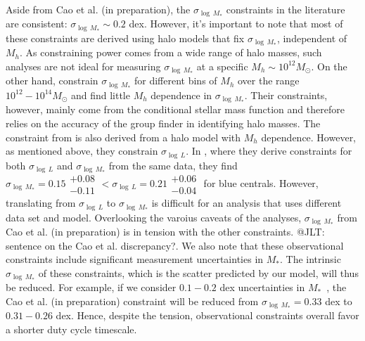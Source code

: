 \documentclass[12pt, letterpaper, preprint, tighten]{aastex62}
\newcommand{\ch}[1]{\color{orange}{\bf CH:} #1}
\begin{document}
Aside from Cao et al. (in preparation), the $\sigma_{\log\,M_*}$ constraints 
in the literature are consistent: $\sigma_{\log\,M_*} \sim 0.2$ dex. However, 
it's important to note that most of these constraints are derived using halo
models that fix $\sigma_{\log\,M_*}$, independent of $M_h$. As constraining 
power comes from a wide range of halo masses, such analyses are not ideal 
for measuring $\sigma_{\log\,M_*}$ at a specific $M_h\sim 10^{12}M_\odot$. 
On the other hand, \cite{reddick2013} constrain $\sigma_{\log\,M_*}$ for 
different bins of $M_h$ over the range $10^{12} - 10^{14} M_\odot$ and find 
little $M_h$ dependence in $\sigma_{\log\,M_*}$. Their constraints, however,
mainly come from the conditional stellar mass function and therefore relies on 
the accuracy of the \cite{tinker2011} group finder in identifying halo masses. 
The constraint from \cite{lange2018a} is also derived from a halo model 
with $M_h$ dependence. However, as mentioned above, they constrain $\sigma_{\log\,L}$. 
In \cite{more2011}, where they derive constraints for both $\sigma_{\log\,L}$ 
and $\sigma_{\log\,M_*}$ from the same data, they find 
$\sigma_{\log\,M_*} = 0.15\substack{+0.08\\ -0.11} < \sigma_{\log\,L} = 0.21\substack{+0.06\\ -0.04}$
for blue centrals. However, translating from $\sigma_{\log\,L}$ to 
$\sigma_{\log\,M_*}$ is difficult for an analysis that uses different data 
set and model. Overlooking the varoius caveats of the analyses, 
$\sigma_{\log\,M_*}$ from Cao et al. (in preparation) is in tension with 
the other constraints. {\ch @JLT: sentence on the Cao et al. discrepancy?}. 
We also note that these observational constraints include significant measurement 
uncertainties in $M_*$. The intrinsic $\sigma_{\log\,M_*}$ of these constraints, 
which is the scatter predicted by our model, will thus be reduced. For example, 
if we consider $0.1 - 0.2$ dex uncertainties in $M_*$~\citep{roediger2015}, 
the Cao et al. (in preparation) constraint will be reduced from 
$\sigma_{\log\,M_*} = 0.33$ dex to $0.31 - 0.26$ dex. Hence, despite the tension, 
observational constraints overall favor a shorter duty cycle timescale. 
\end{document}
